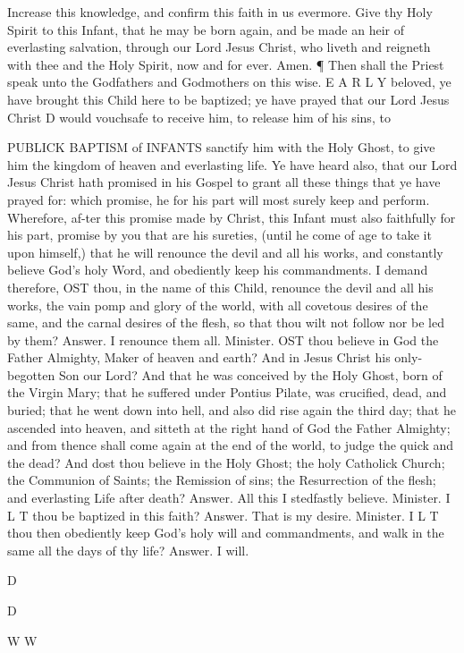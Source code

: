 Increase this knowledge, and confirm this faith in us evermore. Give thy Holy Spirit to this Infant, that he may be born again, and be made an heir of everlasting salvation, through our Lord Jesus Christ, who liveth and reigneth with thee and the Holy Spirit, now and for ever. Amen. ¶ Then shall the Priest speak unto the Godfathers and Godmothers on this wise. E A R L Y beloved, ye have brought this Child here to be baptized; ye have prayed that our Lord Jesus Christ D would vouchsafe to receive him, to release him of his sins, to

PUBLICK BAPTISM of INFANTS sanctify him with the Holy Ghost, to give him the kingdom of heaven and everlasting life. Ye have heard also, that our Lord Jesus Christ hath promised in his Gospel to grant all these things that ye have prayed for: which promise, he for his part will most surely keep and perform. Wherefore, af-ter this promise made by Christ, this Infant must also faithfully for his part, promise by you that are his sureties, (until he come of age to take it upon himself,) that he will renounce the devil and all his works, and constantly believe God’s holy Word, and obediently keep his commandments. I demand therefore, OST thou, in the name of this Child, renounce the devil and all his works, the vain pomp and glory of the world, with all covetous desires of the same, and the carnal desires of the flesh, so that thou wilt not follow nor be led by them? Answer. I renounce them all. Minister. OST thou believe in God the Father Almighty, Maker of heaven and earth? And in Jesus Christ his only-begotten Son our Lord? And that he was conceived by the Holy Ghost, born of the Virgin Mary; that he suffered under Pontius Pilate, was crucified, dead, and buried; that he went down into hell, and also did rise again the third day; that he ascended into heaven, and sitteth at the right hand of God the Father Almighty; and from thence shall come again at the end of the world, to judge the quick and the dead? And dost thou believe in the Holy Ghost; the holy Catholick Church; the Communion of Saints; the Remission of sins; the Resurrection of the flesh; and everlasting Life after death? Answer. All this I stedfastly believe. Minister. I L T thou be baptized in this faith? Answer. That is my desire. Minister. I L T thou then obediently keep God’s holy will and commandments, and walk in the same all the days of thy life? Answer. I will.

D

D

W W

